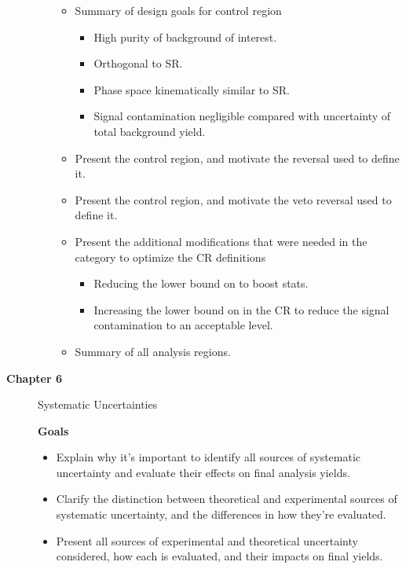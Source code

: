 \begin{description}
\begin{itemize}
\begin{itemize}
\begin{itemize}
\end{itemize}
\item Summary of design goals for control region
\begin{itemize}
\item High purity of background of interest.
\item Orthogonal to SR.
\item Phase space kinematically similar to SR.
\item Signal contamination negligible compared with uncertainty of total background yield.
\end{itemize}
\item Present the \wjets control region, and motivate the \dR reversal used to define it.
\item Present the \ttbar control region, and motivate the \bjet veto reversal used to define it.
\item Present the additional modifications that were needed in the \merged category to optimize the CR definitions
\begin{itemize}
\item Reducing the lower bound on \metsig to boost stats.
\item Increasing the lower bound on \dR in the \wjets CR to reduce the signal contamination to an acceptable level.
\end{itemize}
\item Summary of all analysis regions.
\end{itemize}
\end{itemize}

\item[\textbf{Chapter 6}] Systematic Uncertainties

\textbf{Goals}
\begin{itemize}
\item Explain why it's important to identify all sources of systematic uncertainty and evaluate their effects on final analysis yields. 
\item Clarify the distinction between theoretical and experimental sources of systematic uncertainty, and the differences in how they're evaluated.
\item Present all sources of experimental and theoretical uncertainty considered, how each is evaluated, and their impacts on final yields.
\end{itemize}


\end{description}
